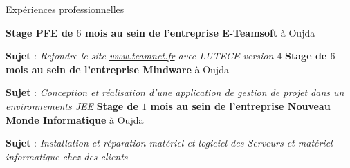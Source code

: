 \begin{rubric}{Expériences professionnelles}

%
	\textbf{Stage PFE de $6$ mois au sein de l’entreprise E-Teamsoft} à Oujda
	\par \textbf{Sujet} : \emph{Refondre le site \url{www.teamnet.fr} avec LUTECE version $4$}
%
%
	\textbf{Stage de $6$ mois au sein de l’entreprise Mindware} à Oujda
	\par \textbf{Sujet} : \emph{Conception et réalisation d'une application de gestion de projet dans un environnements JEE}
%
%
	\textbf{Stage de $1$ mois au sein de l’entreprise Nouveau Monde Informatique} à Oujda
	\par \textbf{Sujet} : \emph{Installation et réparation matériel et logiciel des Serveurs et matériel informatique chez des clients}
%
\end{rubric}
